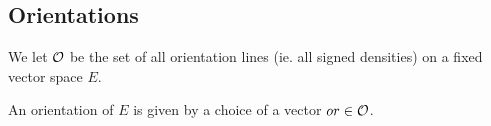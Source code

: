 \documentclass[../main.tex]{subfiles}
\begin{document}
\subsection{Orientations}
We let $\mathcal{O}$ be the set of all orientation lines (ie. all signed densities) on a fixed vector space $E$.
\begin{defn}[Orientation]
	An orientation of $E$ is given by a choice of a vector $or\in \mathcal{O}$.
\end{defn}
\end{document}
